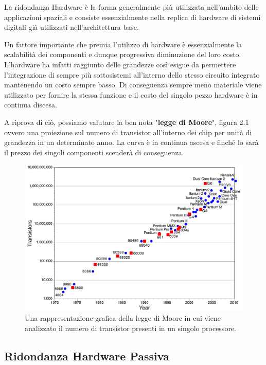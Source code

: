 \documentclass[LaM,binding=0.6cm,oneside]{../sapthesis}
\begin{document}
La ridondanza Hardware è la forma generalmente più utilizzata nell'ambito delle applicazioni spaziali e consiste essenzialmente nella replica di hardware di sistemi digitali già utilizzati nell'architettura base.

Un fattore importante che premia l'utilizzo di hardware è essenzialmente la scalabilità dei componenti e dunque progressiva diminuzione del loro costo. L'hardware ha infatti raggiunto delle grandezze così esigue da permettere l'integrazione di sempre più sottosistemi all'interno dello stesso circuito integrato mantenendo un costo sempre basso. Di conseguenza sempre meno materiale viene utilizzato per fornire la stessa funzione e il costo del singolo pezzo hardware è in continua discesa.

A riprova di ciò, possiamo valutare la ben nota "\textbf{legge di Moore}", figura 2.1 ovvero una proiezione sul numero di transistor all'interno dei chip per unità di grandezza in un determinato anno. La curva è in continua ascesa e finché lo sarà il prezzo dei singoli componenti scenderà di conseguenza.

    \begin{figure}[htbp]
    \centerline{\includegraphics[scale=.27]{examples/Moores_Law.jpg}}
    \caption{Una rappresentazione grafica della legge di Moore in cui viene analizzato il numero di transistor presenti in un singolo processore.}
    \label{fig}
    \end{figure}
\newline

\subsection{Ridondanza Hardware Passiva}
\end{document}
